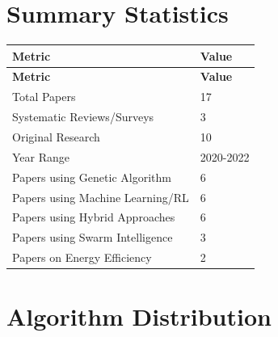 \documentclass[12pt]{article}
\begin{document}
\section{Summary Statistics}

\begin{longtable}{|p{4cm}|p{3cm}|}
	\toprule
	\textbf{Metric}                  & \textbf{Value} \\
	\midrule
	\endfirsthead
	\toprule
	\textbf{Metric}                  & \textbf{Value} \\
	\midrule
	\endhead
	\midrule
	\endfoot
	\bottomrule
	\endlastfoot

	Total Papers                     & 17             \\
	Systematic Reviews/Surveys       & 3              \\
	Original Research                & 10             \\
	Year Range                       & 2020-2022      \\
	Papers using Genetic Algorithm   & 6              \\
	Papers using Machine Learning/RL & 6              \\
	Papers using Hybrid Approaches   & 6              \\
	Papers using Swarm Intelligence  & 3              \\
	Papers on Energy Efficiency      & 2              \\
\end{longtable}

\section{Algorithm Distribution}
\end{document}
